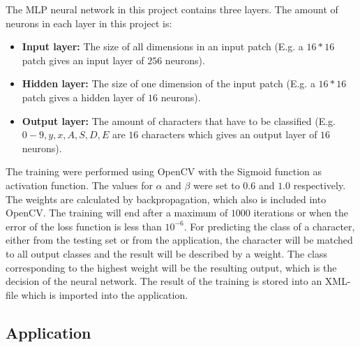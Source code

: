 \documentclass[12pt]{report}
\begin{document}
The MLP neural network in this project contains three layers. The amount of neurons in each layer in this project is:

\begin{itemize}  
\item \textbf{Input layer:} The size of all dimensions in an input patch (E.g. a $16*16$ patch gives an input layer of $256$ neurons).
\item \textbf{Hidden layer:} The size of one dimension of the input patch (E.g. a $16*16$ patch gives a hidden layer of $16$ neurons).
\item \textbf{Output layer:} The amount of characters that have to be classified (E.g. $0-9, y, x, A, S, D, E$ are $16$ characters which gives an output layer of $16$ neurons). 
\end{itemize}
The training were performed using OpenCV with the Sigmoid function as activation function. The values for $\alpha$ and $\beta$ were set to $0.6$ and $1.0$ respectively. The weights are calculated by backpropagation, which also is included into OpenCV. The training will end after a maximum of $1000$ iterations or when the error of the loss function is less than $10^{-6}$. For predicting the class of a character, either from the testing set or from the application, the character will be matched to all output classes and the result will be described by a weight. The class corresponding to the highest weight will be the resulting output, which is the decision of the neural network. The result of the training is stored into an XML-file which is imported into the application. 


\subsection*{Application}
\end{document}
